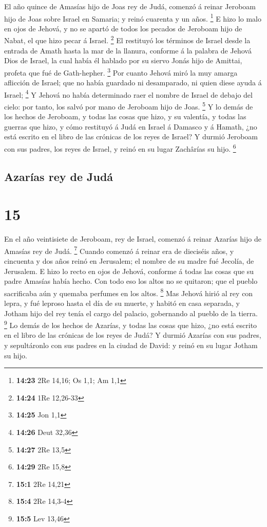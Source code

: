  El año quince de Amasías hijo de Joas rey de Judá, comenzó
á reinar Jeroboam hijo de Joas sobre Israel en Samaria; y reinó cuarenta
y un años. \footnote{\textbf{14:23} 2Re 14,16; Os 1,1; Am 1,1}
 E hizo lo malo en ojos de Jehová, y no se apartó de todos
los pecados de Jeroboam hijo de Nabat, el que hizo pecar á Israel.
\footnote{\textbf{14:24} 1Re 12,26-33}  El restituyó los
términos de Israel desde la entrada de Amath hasta la mar de la llanura,
conforme á la palabra de Jehová Dios de Israel, la cual había él hablado
por su siervo Jonás hijo de Amittai, profeta que fué de Gath-hepher.
\footnote{\textbf{14:25} Jon 1,1}  Por cuanto Jehová miró
la muy amarga aflicción de Israel; que no había guardado ni desamparado,
ni quien diese ayuda á Israel; \footnote{\textbf{14:26} Deut 32,36}
 Y Jehová no había determinado raer el nombre de Israel de
debajo del cielo: por tanto, los salvó por mano de Jeroboam hijo de
Joas. \footnote{\textbf{14:27} 2Re 13,5}  Y lo demás de los
hechos de Jeroboam, y todas las cosas que hizo, y su valentía, y todas
las guerras que hizo, y cómo restituyó á Judá en Israel á Damasco y á
Hamath, ¿no está escrito en el libro de las crónicas de los reyes de
Israel?  Y durmió Jeroboam con sus padres, los reyes de
Israel, y reinó en su lugar Zachârías su hijo. \footnote{\textbf{14:29}
  2Re 15,8}

\hypertarget{azaruxedas-rey-de-juduxe1}{%
\subsection{Azarías rey de Judá}\label{azaruxedas-rey-de-juduxe1}}

\hypertarget{section-14}{%
\section{15}\label{section-14}}

 En el año veintisiete de Jeroboam, rey de Israel, comenzó á
reinar Azarías hijo de Amasías rey de Judá. \footnote{\textbf{15:1} 2Re
  14,21}  Cuando comenzó á reinar era de dieciséis años, y
cincuenta y dos años reinó en Jerusalem; el nombre de su madre fué
Jecolía, de Jerusalem.  E hizo lo recto en ojos de Jehová,
conforme á todas las cosas que su padre Amasías había hecho.
 Con todo eso los altos no se quitaron; que el pueblo
sacrificaba aún y quemaba perfumes en los altos. \footnote{\textbf{15:4}
  2Re 14,3-4}  Mas Jehová hirió al rey con lepra, y fué
leproso hasta el día de su muerte, y habitó en casa separada, y Jotham
hijo del rey tenía el cargo del palacio, gobernando al pueblo de la
tierra. \footnote{\textbf{15:5} Lev 13,46}  Lo demás de los
hechos de Azarías, y todas las cosas que hizo, ¿no está escrito en el
libro de las crónicas de los reyes de Judá?  Y durmió
Azarías con sus padres, y sepultáronlo con sus padres en la ciudad de
David: y reinó en su lugar Jotham su hijo.

